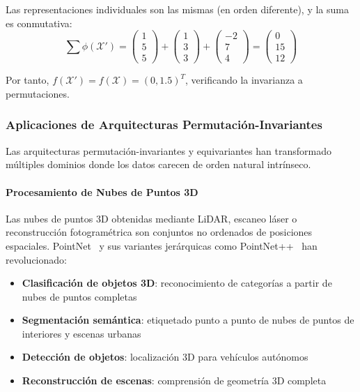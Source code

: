 \begin{example}
Las representaciones individuales son las mismas (en orden diferente), y la suma es conmutativa:
\begin{equation}
\sum \phi(\mathcal{X}') = \begin{pmatrix} 1 \\ 5 \\ 5 \end{pmatrix} + \begin{pmatrix} 1 \\ 3 \\ 3 \end{pmatrix} + \begin{pmatrix} -2 \\ 7 \\ 4 \end{pmatrix} = \begin{pmatrix} 0 \\ 15 \\ 12 \end{pmatrix}
\end{equation}

Por tanto, $f(\mathcal{X}') = f(\mathcal{X}) = (0, 1.5)^T$, verificando la invarianza a permutaciones.
\end{example}

\subsubsection{Aplicaciones de Arquitecturas Permutación-Invariantes}

Las arquitecturas permutación-invariantes y equivariantes han transformado múltiples dominios donde los datos carecen de orden natural intrínseco.

\paragraph{Procesamiento de Nubes de Puntos 3D}

Las nubes de puntos 3D obtenidas mediante LiDAR, escaneo láser o reconstrucción fotogramétrica son conjuntos no ordenados de posiciones espaciales. PointNet~\citep{qi2017pointnet} y sus variantes jerárquicas como PointNet++~\citep{qi2017pointnetplus} han revolucionado:

\begin{itemize}
    \item \textbf{Clasificación de objetos 3D}: reconocimiento de categorías a partir de nubes de puntos completas
    \item \textbf{Segmentación semántica}: etiquetado punto a punto de nubes de puntos de interiores y escenas urbanas
    \item \textbf{Detección de objetos}: localización 3D para vehículos autónomos
    \item \textbf{Reconstrucción de escenas}: comprensión de geometría 3D completa
\end{itemize}

